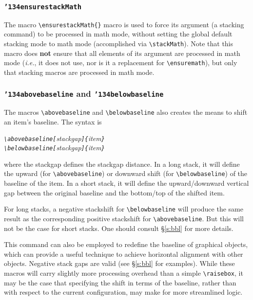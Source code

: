 \documentclass{article}
\let\vb\verb
\newcommand\cmd[1]{\texttt{\char'134#1}}
\begin{document}
\subsubsection{\cmd{ensurestackMath}\label{s:esm}}

The macro \vb|\ensurestackMath{}| macro is used to force its argument
(a stacking command) to be processed in math mode, without setting 
the global default stacking 
mode to math mode (accomplished via \vb|\stackMath|). Note 
that this macro does \textbf{not} ensure that
all elements of its argument are processed in math mode (\textit{i.e.}, 
it does not use, nor is it a replacement for \vb|\ensuremath|), but 
only that stacking macros are processed in math mode.

\subsubsection{\cmd{abovebaseline} and \cmd{belowbaseline}\label{s:abb}}

The macros \vb|\abovebaseline| and \vb|\belowbaseline| also creates the
means to shift an item's baseline.  The syntax is

\itshape
\vb|\abovebaseline[|stackgap\vb|]{|item\vb|}|\\
\vb|\belowbaseline[|stackgap\vb|]{|item\vb|}|
\upshape

where the stackgap defines the stackgap distance.  In a long stack, it
will define the upward (for \vb|\abovebaseline|) or downward shift
(for \vb|\belowbaseline|) of the baseline of the item.  In a short
stack, it will define the upward/downward vertical gap between the
original baseline and the bottom/top of the shifted item.

For long stacks, a negative stackshift for \vb|\belowbaseline| will
produce the same result as the corresponding positive stackshift for
\vb|\abovebaseline|.  But this will not be the case for short stacks.
One should consult \S\ref{s:bbl} for more details.

This command can also be employed to redefine the baseline of graphical
objects, which can provide a useful technique to achieve horizontal
alignment with other objects.  Negative stack gaps are valid (see
\S\ref{s:bbl} for examples).  While these macros will carry slightly 
more processing overhead than a simple \vb|\raisebox|, it may be the 
case that specifying the shift in terms of the baseline, rather than 
with respect to the current configuration, may make for more 
streamlined logic.
\end{document}
